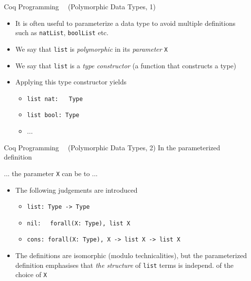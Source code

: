 \begin{frame}[fragile]{Coq Programming\small~~ (Polymorphic Data Types, 1)}
\begin{itemize}
  \item It is often useful to parameterize a data type to avoid multiple definitions such as \lstinline|natList|, \lstinline|boolList| etc.


  \pause

  \item We say that \lstinline|list| is \textit{polymorphic} in its \textit{parameter} \lstinline|X|

  \pause

  \item We say that \lstinline|list| is a \textit{type constructor} (a function that constructs a type)

  \pause

  \item Applying this type constructor yields

  \begin{itemize}
    \item \lstinline|list nat:  |\lstinline| Type|
    \item \lstinline|list bool: |\lstinline|Type|
    \item ...
  \end{itemize}
\end{itemize}
\end{frame}

\begin{frame}[fragile]{Coq Programming\small~~ (Polymorphic Data Types, 2)}
In the parameterized definition

... the parameter \lstinline|X| can be  to ...

\begin{itemize}
  \pause

  \item The following judgements are introduced
  \begin{itemize}
    \item \lstinline|list: Type -> Type|
    \item \lstinline|nil:| ~\lstinline| forall(X: Type), list X|
    \item \lstinline|cons: forall(X: Type), X -> list X -> list X|
  \end{itemize}

  \pause

  \item The definitions are isomorphic (modulo technicalities), but the parameterized definition emphasises that \textit{the structure} of \lstinline|list| terms is independ. of the choice of \lstinline|X|
\end{itemize}
\end{frame}

